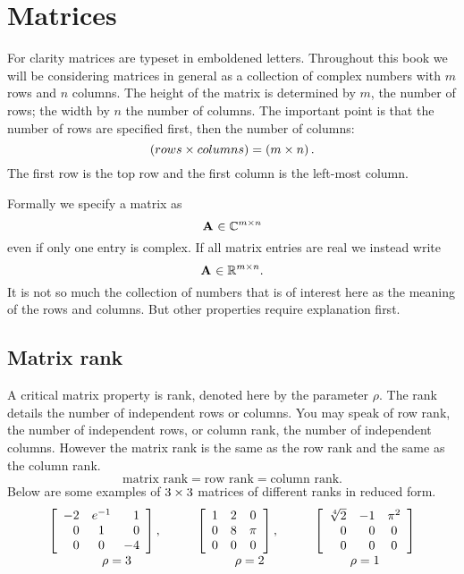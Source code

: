 \section{Matrices}
For clarity matrices are typeset in emboldened letters. Throughout this book we will be considering matrices in general as a collection of complex numbers with $m$ rows and $n$ columns. The height of the matrix is determined by $m$, the number of rows; the width by $n$ the number of columns. The important point is that the number of rows are specified first, then the number of columns:
\begin{equation}
  \paren{\by{rows}{columns}}=\paren{\by{m}{n}}.
\end{equation}
The first row is the top row and the first column is the left-most column.

Formally we specify a matrix as
\begin{equation}
  \A{}\in\cmplx{\by{m}{n}}
\end{equation}
even if only one entry is complex. If all matrix entries are real we instead write
\begin{equation}
  \A{}\in\real{\by{m}{n}}.
\end{equation}
It is not so much the collection of numbers that is of interest here as the meaning of the rows and columns. But other properties require explanation first.

\subsection{Matrix rank}
A critical matrix property is rank, denoted here by the parameter $\rho$.  The rank details the number of independent rows or columns. You may speak of row rank, the number of independent rows, or column rank, the number of independent columns. However the matrix rank is the same as the row rank and the same as the column rank. 
$$
\text{matrix rank} = \text{row rank} = \text{column rank}.
$$
Below are some examples of $\bys{3}$ matrices of different ranks in reduced form.
\begin{equation}
\begin{array}{ccc}
\mat{rcr}
{
-2 & e^{-1} & 1\\
 0 &  1 & 0\\
 0 &  0 &-4
}, \qquad & 
\mat{ccc}
{
 1 &  2 & 0\\
 0 &  8 & \pi\\
 0 &  0 & 0
}, \qquad & 
\mat{rrc}
{
\sqrt[4]{2} & -1 & \pi^{2}\\
 0 &  0 & 0\\
 0 &  0 & 0
} \\[5pt]
\rho = 3 & \rho = 2 & \rho = 1
\end{array}
\end{equation}

